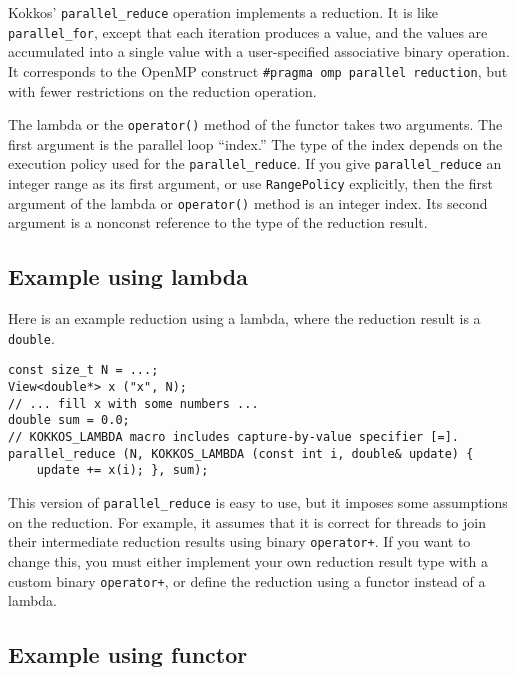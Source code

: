 Kokkos' \lstinline!parallel_reduce! operation implements a reduction.
It is like \lstinline!parallel_for!, except that each iteration
produces a value, and the values are accumulated into a single value
with a user-specified associative binary operation.  It corresponds to
the OpenMP construct \lstinline!#pragma omp parallel reduction!, but
with fewer restrictions on the reduction operation.

The lambda or the \lstinline!operator()! method of the functor takes two arguments.
The first argument is the parallel loop ``index.''
The type of the index depends on the execution policy used for the \lstinline!parallel_reduce!.
If you give \lstinline!parallel_reduce! an integer range as its first argument,
or use \lstinline!RangePolicy! explicitly,
then the first argument of the lambda or \lstinline!operator()! method is an integer index.
Its second argument is a nonconst reference to the type of the reduction result.

\subsection{Example using lambda}

Here is an example reduction using a lambda,
where the reduction result is a \lstinline!double!.
\begin{lstlisting}
const size_t N = ...;
View<double*> x ("x", N);
// ... fill x with some numbers ... 
double sum = 0.0;
// KOKKOS_LAMBDA macro includes capture-by-value specifier [=].
parallel_reduce (N, KOKKOS_LAMBDA (const int i, double& update) {
    update += x(i); }, sum);
\end{lstlisting}
This version of \verb!parallel_reduce! is easy to use,
but it imposes some assumptions on the reduction.
For example, it assumes that it is correct for threads to join their intermediate reduction results using binary \lstinline!operator+!.
If you want to change this, you must either implement your own reduction result type with a custom binary \lstinline!operator+!,
or define the reduction using a functor instead of a lambda.

\subsection{Example using functor}


